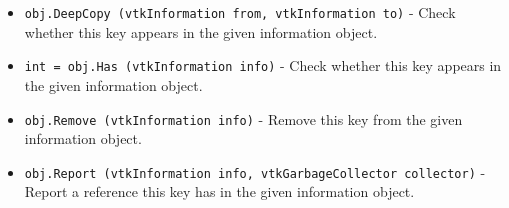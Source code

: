 \begin{itemize}
\item  \verb|obj.DeepCopy (vtkInformation from, vtkInformation to)| -  Check whether this key appears in the given information object.

\item  \verb|int = obj.Has (vtkInformation info)| -  Check whether this key appears in the given information object.

\item  \verb|obj.Remove (vtkInformation info)| -  Remove this key from the given information object.

\item  \verb|obj.Report (vtkInformation info, vtkGarbageCollector collector)| -  Report a reference this key has in the given information object.

\end{itemize}
